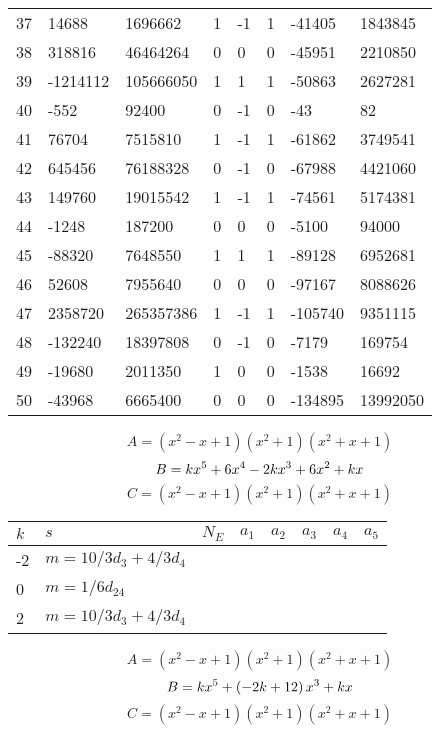 \documentclass{amsart}
\begin{document}
\begin{longtable}{|l|l|l|lllll|}
37&14688&1696662&1&-1&1&-41405&1843845\\
38&318816&46464264&0&0&0&-45951&2210850\\
39&-1214112&105666050&1&1&1&-50863&2627281\\
40&-552&92400&0&-1&0&-43&82\\
41&76704&7515810&1&-1&1&-61862&3749541\\
42&645456&76188328&0&-1&0&-67988&4421060\\
43&149760&19015542&1&-1&1&-74561&5174381\\
44&-1248&187200&0&0&0&-5100&94000\\
45&-88320&7648550&1&1&1&-89128&6952681\\
46&52608&7955640&0&0&0&-97167&8088626\\
47&2358720&265357386&1&-1&1&-105740&9351115\\
48&-132240&18397808&0&-1&0&-7179&169754\\
49&-19680&2011350&1&0&0&-1538&16692\\
50&-43968&6665400&0&0&0&-134895&13992050\\
\hline
\end{longtable}
$$A=(x^2
 - x
 + 1)(x^2
 + 1)(x^2
 + x
 + 1)$$
$$B=k\*x^5
 + 6\*x^4
 - 2\*k\*x^3
 + 6\*x^2
 + k\*x$$
$$C=(x^2
 - x
 + 1)(x^2
 + 1)(x^2
 + x
 + 1)$$
\begin{longtable}{|l|l|l|lllll|}
\hline
$k$ & $s$ & $N_E$ & $a_1$ & $a_2$ & $a_3$ & $a_4$ & $a_5$\\
\hline
-2&$m=10/3d_{3}+4/3d_{4}$&&\multicolumn{5}{c|}{}\\
0&$m=1/6d_{24}$&&\multicolumn{5}{c|}{}\\
2&$m=10/3d_{3}+4/3d_{4}$&&\multicolumn{5}{c|}{}\\
\hline
\end{longtable}
$$A=(x^2
 - x
 + 1)(x^2
 + 1)(x^2
 + x
 + 1)$$
$$B=k\*x^5
 + \left(-2\*k
 + 12\right) \*x^3
 + k\*x$$
$$C=(x^2
 - x
 + 1)(x^2
 + 1)(x^2
 + x
 + 1)$$
\end{document}
